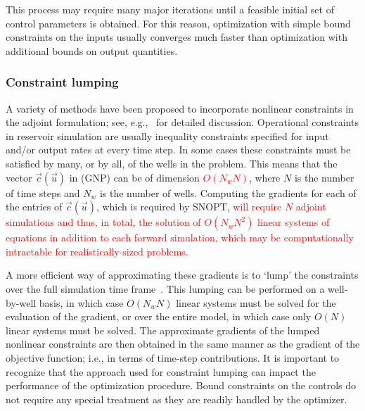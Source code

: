 \documentclass[twocolumn,numbook]{svjour3}          %
\newcommand{\red}[1]{\textcolor{red}{#1}}
\def\u{{\vec u}}
\def\c{{\vec c}}
\begin{document}
This process may require many major iterations until a feasible initial set of control parameters
is obtained. For this reason, optimization with simple bound constraints on 
the inputs usually converges much faster than optimization with additional bounds
on output quantities.

\subsubsection{Constraint lumping}

A variety of methods have been proposed to
incorporate nonlinear constraints in the adjoint formulation; see,
e.g.,~\cite{Pallav:2006,Jansen:2011,Suwartadi:2012,Chen:2010} for detailed discussion. 
Operational constraints in reservoir simulation are usually inequality constraints specified for input and/or output rates at every time step. In some cases these constraints must be satisfied by many, or by all, of the wells in the problem.
This means that the vector $\c(\u)$ in (GNP) can be of dimension \red{$O(N_w N)$}, where $N$ is the number of time steps and $N_w$ is the number of wells. Computing the gradients
for each of the entries of $\c(\u)$, which is required by SNOPT, \red{will require $N$ adjoint simulations and thus, in total, the solution of $O(N_w N^2 )$ linear systems of equations in addition to each forward simulation, which may be
computationally intractable for realistically-sized problems.}

A more efficient way of approximating these gradients 
is to `lump' the constraints over the full simulation time frame~\cite{Pallav:2008}. 
This lumping can be performed on a well-by-well basis, in which case $O(N_w N)$ linear systems 
must be solved for the evaluation of the gradient, or over the entire model, in which case only $O(N)$ linear systems must be solved. The approximate gradients of the lumped
nonlinear constraints are then obtained in the same manner as the gradient of the
objective function; i.e., in terms of time-step contributions. It is important to recognize that the approach used for constraint lumping can impact the performance of the optimization procedure. Bound constraints on the controls do not require any special treatment as they are readily handled by the optimizer.
\end{document}
